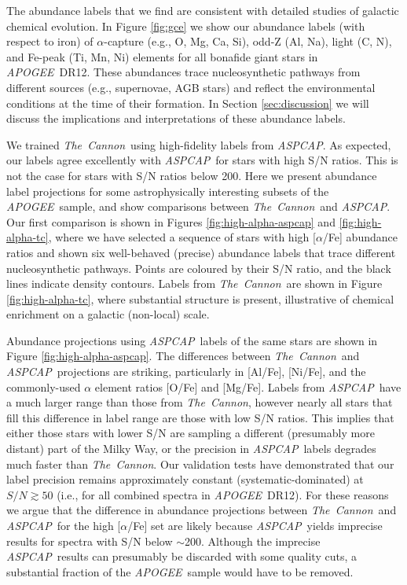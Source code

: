 \documentclass[12pt,preprint]{aastex}
\newcommand{\project}[1]{\textsl{#1}}
\newcommand{\TheCannon}{\project{The~Cannon}}
\newcommand{\acronym}[1]{{\small{#1}}}
\newcommand{\apogee}{\project{\acronym{APOGEE}}}
\newcommand{\aspcap}{\project{\acronym{ASPCAP}}}
\newcommand{\dr}{\acronym{DR12}}
\begin{document}
The abundance labels that we find are consistent with detailed studies
of galactic chemical evolution.  In Figure \ref{fig:gce} we show our abundance
labels (with respect to iron) of $\alpha$-capture (e.g., O, Mg, Ca, Si), odd-Z
(Al, Na), light (C, N), and Fe-peak (Ti, Mn, Ni) elements for all bonafide
giant stars in \apogee\ \dr.  These abundances trace nucleosynthetic pathways
from different sources (e.g., supernovae, AGB stars) and reflect the environmental
conditions at the time of their formation.  In Section \ref{sec:discussion} 
we will discuss the implications and interpretations of these abundance
labels.


We trained \TheCannon\ using high-fidelity labels from \aspcap.  As expected,
our labels agree excellently with \aspcap\ for stars with high S/N ratios.
This is not the case for stars with S/N ratios below 200.  Here we present
abundance label projections for some astrophysically interesting subsets of
the \apogee\ sample, and show comparisons between \TheCannon\ and \aspcap.
Our first comparison is shown in Figures \ref{fig:high-alpha-aspcap} and
\ref{fig:high-alpha-tc}, where we have selected a sequence of stars with
high [$\alpha$/Fe] abundance ratios and shown six well-behaved (precise)
abundance labels that trace different nucleosynthetic pathways.  Points are
coloured by their S/N ratio, and the black lines indicate density contours.
Labels from \TheCannon\ are shown in Figure \ref{fig:high-alpha-tc}, where
substantial structure is present, illustrative of chemical enrichment on a
galactic (non-local) scale.


Abundance projections using \aspcap\ labels of the same stars are shown
in Figure \ref{fig:high-alpha-aspcap}.  The differences between \TheCannon\
and \aspcap\ projections are striking, particularly in [Al/Fe], [Ni/Fe],
and the commonly-used $\alpha$ element ratios [O/Fe] and [Mg/Fe].  Labels
from \aspcap\ have a much larger range than those from \TheCannon,
however nearly all stars that fill this difference in label range are those
with low S/N ratios.  This implies that either those stars with lower S/N
are sampling a different (presumably more distant) part of the Milky Way,
or the precision in \aspcap\ labels degrades much faster than \TheCannon.
Our validation tests have demonstrated that our label precision remains
approximately constant (systematic-dominated) at $S/N \gtrsim 50$ (i.e.,
for all combined spectra in \apogee\ \dr).  For these reasons we argue
that the difference in abundance projections between \TheCannon\ and
\aspcap\ for the high [$\alpha$/Fe] set are likely because \aspcap\
yields imprecise results for spectra with S/N below $\sim$200.  Although
the imprecise \aspcap\ results can presumably be discarded with some 
quality cuts, a substantial fraction of the \apogee\ sample would have
to be removed.
\end{document}
